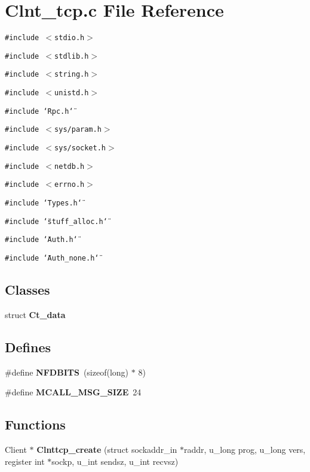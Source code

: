 \section{Clnt\_\-tcp.c File Reference}
\label{Clnt__tcp_8c}
{\tt \#include $<$stdio.h$>$}\par
{\tt \#include $<$stdlib.h$>$}\par
{\tt \#include $<$string.h$>$}\par
{\tt \#include $<$unistd.h$>$}\par
{\tt \#include \char`\"{}Rpc.h\char`\"{}}\par
{\tt \#include $<$sys/param.h$>$}\par
{\tt \#include $<$sys/socket.h$>$}\par
{\tt \#include $<$netdb.h$>$}\par
{\tt \#include $<$errno.h$>$}\par
{\tt \#include \char`\"{}Types.h\char`\"{}}\par
{\tt \#include \char`\"{}stuff\_\-alloc.h\char`\"{}}\par
{\tt \#include \char`\"{}Auth.h\char`\"{}}\par
{\tt \#include \char`\"{}Auth\_\-none.h\char`\"{}}\par
\subsection*{Classes}
\begin{CompactItemize}
\item 
struct {\bf Ct\_\-data}
\end{CompactItemize}
\subsection*{Defines}
\begin{CompactItemize}
\item 
\#define {\bf NFDBITS}\ (sizeof(long) $\ast$ 8)
\item 
\#define {\bf MCALL\_\-MSG\_\-SIZE}\ 24
\end{CompactItemize}
\subsection*{Functions}
\begin{CompactItemize}
\item 
Client $\ast$ {\bf Clnttcp\_\-create} (struct sockaddr\_\-in $\ast$raddr, u\_\-long prog, u\_\-long vers, register int $\ast$sockp, u\_\-int sendsz, u\_\-int recvsz)
\end{CompactItemize}


